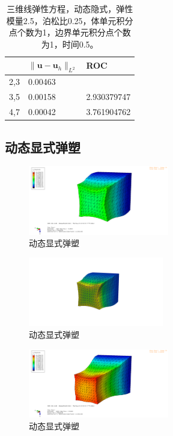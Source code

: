 \begin{table}[!htbp]
  \centering
  \begin{tabular}{c|l|l}
    & $\|\mathbf u-\mathbf u_h\|_{L^2}$ & ROC\\
    \hline
    2,3 & 0.00463 &  \\
    \hline
    3,5 & 0.00158    &  2.930379747\\
    \hline
    4,7 & 0.00042   &     3.761904762
  \end{tabular}
  \caption{三维线弹性方程，动态隐式，弹性模量2.5，泊松比0.25，体单元积分点个数为1，边界单元积分点个数为1，时间0.5。}
\end{table}





\subsection{动态显式弹塑}

\begin{figure}[!htbp]
  \centering
  \includegraphics[height=3cm]{fig/4/4.1.5/3.png}
  \caption{动态显式弹塑}
  \label{fig:4.1.4:4}
\end{figure}

\begin{figure}[!htbp]
  \centering
  \includegraphics[height=3cm]{fig/4/4.1.5/3-1.png}
  \caption{动态显式弹塑}
  \label{fig:4.1.4:4}
\end{figure}

\begin{figure}[!htbp]
  \centering
  \includegraphics[height=3cm]{fig/4/4.1.5/4.png}
  \caption{动态显式弹塑}
  \label{fig:4.1.4:4}
\end{figure}

